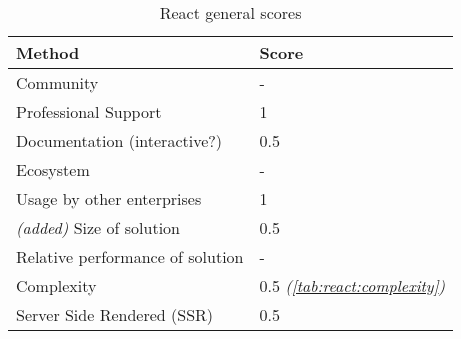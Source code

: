 \begin{table}[H]
    \centering
    \begin{tabular}{|l|l|}
        \hline
        \textbf{Method}                   & \textbf{Score}                                \\
        \hline
        Community                         & -                                             \\ \hline
        Professional Support              & 1                                             \\ \hline
        Documentation (interactive?)      & 0.5                                           \\ \hline
        Ecosystem                         & -                                             \\ \hline
        Usage by other enterprises        & 1                                             \\ \hline
        \textit{(added)} Size of solution & 0.5                                           \\ \hline
        Relative performance of solution  & -                                             \\ \hline
        Complexity                        & 0.5 \textit{(\autoref{tab:react:complexity})} \\ \hline
        Server Side Rendered (SSR)        & 0.5                                           \\ \hline
    \end{tabular}
    \caption{React general scores}
    \label{tab:react:scores}
\end{table}